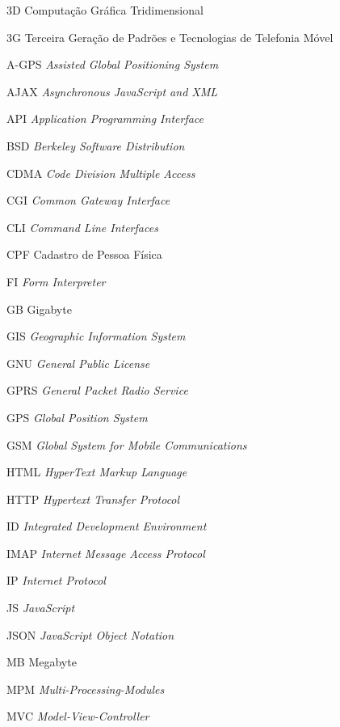 
\begin{siglas}
    \item[3D] Computação Gráfica Tridimensional
    \item[3G] Terceira Geração de Padrões e Tecnologias de Telefonia Móvel
    \item[A-GPS] \textit{Assisted Global Positioning System}
    \item[AJAX] \textit{Asynchronous JavaScript and XML}
    \item[API] \textit{Application Programming Interface}
    \item[BSD] \textit{Berkeley Software Distribution}
    \item[CDMA] \textit{Code Division Multiple Access}
    \item[CGI] \textit{Common Gateway Interface}
    \item[CLI] \textit{Command Line Interfaces}
    \item[CPF] Cadastro de Pessoa Física
    \item[FI] \textit{Form Interpreter}
    \item[GB] Gigabyte
    \item[GIS] \textit{Geographic Information System}
    \item[GNU] \textit{General Public License}
    \item[GPRS] \textit{General Packet Radio Service}
    \item[GPS] \textit{Global Position System}
    \item[GSM] \textit{Global System for Mobile Communications}
    \item[HTML] \textit{HyperText Markup Language}
    \item[HTTP] \textit{Hypertext Transfer Protocol}
    \item[ID] \textit{Integrated Development Environment}
    \item[IMAP] \textit{Internet Message Access Protocol}
    \item[IP] \textit{Internet Protocol}
    \item[JS] \textit{JavaScript}
    \item[JSON] \textit{JavaScript Object Notation}
    \item[MB] Megabyte
    \item[MPM] \textit{Multi-Processing-Modules}
    \item[MVC] \textit{Model-View-Controller}

\end{siglas}
